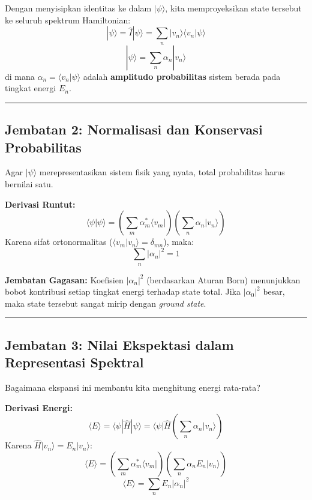 Dengan menyisipkan identitas ke dalam \(|\psi\rangle\), kita memproyeksikan state tersebut ke seluruh spektrum Hamiltonian: \[ |\psi\rangle = \hat{I} |\psi\rangle = \sum_n |v_n\rangle \langle v_n | \psi \rangle \] \[ |\psi\rangle = \sum_n \alpha_n |v_n\rangle \] di mana \(\alpha_n = \langle v_n | \psi \rangle\) adalah \textbf{amplitudo probabilitas} sistem berada pada tingkat energi \(E_n\).

\begin{center}\rule{0.5\linewidth}{0.5pt}\end{center}

\hypertarget{jembatan-2-normalisasi-dan-konservasi-probabilitas}{%
\subsection{Jembatan 2: Normalisasi dan Konservasi Probabilitas}\label{jembatan-2-normalisasi-dan-konservasi-probabilitas}}

Agar \(|\psi\rangle\) merepresentasikan sistem fisik yang nyata, total probabilitas harus bernilai satu.

\textbf{Derivasi Runtut:} \[ \langle \psi | \psi \rangle = \left( \sum_m \alpha_m^* \langle v_m | \right) \left( \sum_n \alpha_n |v_n\rangle \right) \] Karena sifat ortonormalitas (\(\langle v_m | v_n \rangle = \delta_{mn}\)), maka: \[ \sum_n |\alpha_n|^2 = 1 \]

\textbf{Jembatan Gagasan:} Koefisien \(|\alpha_n|^2\) (berdasarkan Aturan Born) menunjukkan bobot kontribusi setiap tingkat energi terhadap state total. Jika \(|\alpha_0|^2\) besar, maka state tersebut sangat mirip dengan \emph{ground state}.

\begin{center}\rule{0.5\linewidth}{0.5pt}\end{center}

\hypertarget{jembatan-3-nilai-ekspektasi-dalam-representasi-spektral}{%
\subsection{Jembatan 3: Nilai Ekspektasi dalam Representasi Spektral}\label{jembatan-3-nilai-ekspektasi-dalam-representasi-spektral}}

Bagaimana ekspansi ini membantu kita menghitung energi rata-rata?

\textbf{Derivasi Energi:} \[ \langle E \rangle = \langle \psi | \hat{H} | \psi \rangle = \langle \psi | \hat{H} \left( \sum_n \alpha_n |v_n\rangle \right) \] Karena \(\hat{H} |v_n\rangle = E_n |v_n\rangle\): \[ \langle E \rangle = \left( \sum_m \alpha_m^* \langle v_m | \right) \left( \sum_n \alpha_n E_n |v_n\rangle \right) \] \[ \langle E \rangle = \sum_n E_n |\alpha_n|^2 \]

